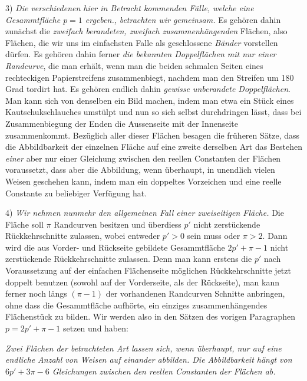 \documentclass{article}
\begin{document}
3) \emph{Die verschiedenen hier in Betracht kommenden Fälle, welche eine Gesammtfläche $p = 1$ ergeben.,} \emph{betrachten wir gemeinsam.} Es gehören dahin zunächst die \emph{zweifach berandeten, zweifach zusammenhängenden} Flächen, also Flächen, die wir uns im einfachsten Falle als geschlossene \emph{Bänder} vorstellen dürfen. Es gehören dahin ferner \emph{die bekannten Doppelflächen mit nur einer Randcurve}, die man erhält, wenn man die beiden schmalen Seiten eines rechteckigen Papierstreifens zusammenbiegt, nachdem man den Streifen um 180 Grad tordirt hat. Es gehören endlich dahin \emph{gewisse unberandete Doppelflächen}. Man kann sich von denselben ein Bild machen, indem man etwa ein Stück eines Kautschukschlauches umstülpt und nun so sich selbst durchdringen lässt, dass bei Zusammenbiegung der Enden die Aussenseite mit der Innenseite zusammenkommt. Bezüglich aller dieser Flächen besagen die früheren Sätze, dass die Abbildbarkeit der einzelnen Fläche auf eine zweite derselben Art das Bestehen \emph{einer} aber nur einer Gleichung zwischen den reellen Constanten der Flächen voraussetzt, dass aber die Abbildung, wenn überhaupt, in unendlich vielen Weisen geschehen kann, indem man ein doppeltes Vorzeichen und eine reelle Constante zu beliebiger Verfügung hat.


4) \emph{Wir nehmen nunmehr den allgemeinen Fall einer zweiseitigen Fläche.} Die Fläche soll $\pi$ Randcurven besitzen und überdiess $p'$ nicht zerstückende Rückkehrschnitte zulassen, wobei entweder $p' > 0$ sein muss oder $\pi > 2$. Dann wird die aus Vorder- und Rückseite gebildete Gesammtfläche $2p' + \pi - 1$ nicht zerstückende Rückkehrschnitte zulassen. Denn man kann erstens die $p'$ nach Voraussetzung auf der einfachen Flächenseite möglichen Rückkehrschnitte jetzt doppelt benutzen (sowohl auf der Vorderseite, als der Rückseite), man kann ferner noch längs $(\pi - 1)$ der vorhandenen Randcurven Schnitte anbringen, ohne dass die Gesammtfläche aufhörte, ein einziges zusammenhängendes Flächenstück zu bilden. Wir werden also in den Sätzen des vorigen Paragraphen $p = 2p' + \pi - 1$ setzen und haben:

\emph{Zwei Flächen der betrachteten Art lassen sich, wenn überhaupt, nur auf eine endliche Anzahl von Weisen auf einander abbilden. Die Abbildbarkeit hängt von $6p' + 3\pi - 6$ Gleichungen zwischen den reellen Constanten der Flächen ab.}
\end{document}
